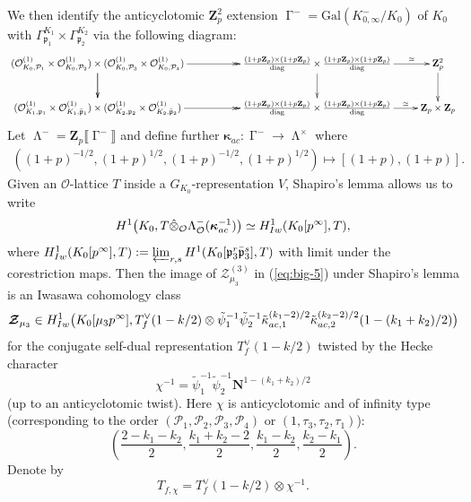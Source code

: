 \documentclass[10pt,letterpaper]{amsart}
\theoremstyle{plain}
\theoremstyle{definition}
\theoremstyle{definition}
\theoremstyle{plain}
\theoremstyle{plain}
\theoremstyle{plain}
\theoremstyle{remark}
\numberwithin{equation}{section}
\newcommand{\pp}{\mathfrak{p}}
\newcommand{\ppbar}{\bar{\mathfrak{p}}}
\DeclareMathOperator{\La}{\Lambda}
\DeclareMathOperator{\Ga}{\Gamma}
\def\cO{\mathcal O}
\def\cP{{\mathcal P}}
\newcommand{\Z}{\mathbf{Z}}
\newcommand{\dBr}[1]{\llbracket{#1}\rrbracket}
\begin{document}
We then identify the anticyclotomic $\Z_p^2$ extension $\Ga^{-}=\text{Gal}(K_{0,\infty}^{-}/K_0)$ of $K_0$ with $\Gamma_{\pp_1}^{K_1}\times \Gamma_{\pp_2}^{K_2}$ via the following diagram:
\begin{equation}
    \label{eq:G_K0^-identification}
\xymatrix{
(\mathcal{O}_{K_0,\cP_1}^{(1)}\times \mathcal{O}_{K_0,\cP_2}^{(1)})\times (\mathcal{O}_{K_0,\cP_3}^{(1)}\times \mathcal{O}_{K_0,\cP_4}^{(1)})\ar[d]\ar@{->>}[rr]\ar[d]&&\frac{(1+p\Z_p)\times(1+p\Z_p)}{\mathrm{diag}}\times \frac{(1+p\Z_p)\times(1+p\Z_p)}{\mathrm{diag}}\ar[d] \ar[r]^-{\simeq}&\Z_p^2\ar[d]\\
(\mathcal{O}_{K_1,\mathfrak{p}_1}^{(1)}\times \mathcal{O}_{K_1,\ppbar_1}^{(1)})\times (\mathcal{O}_{K_2,\mathfrak{p}_2}^{(1)}\times \mathcal{O}_{K_2,\ppbar_2}^{(1)})\ar@{->>}[rr]&&\frac{(1+p\Z_p)\times(1+p\Z_p)}{\mathrm{diag}}\times \frac{(1+p\Z_p)\times(1+p\Z_p)}{\mathrm{diag}}\ar[r]^-{\simeq}&\Z_p\times \Z_p
}
\end{equation}
Let $\La^-=\Z_p\dBr{\Ga^-}$ and define further $\bm{\kappa}_{ac}:\Ga^- \rightarrow \La^{\times}$ where
\begin{align*}
    ((1+p)^{-1/2},(1+p)^{1/2},(1+p)^{-1/2},(1+p)^{1/2})\mapsto [(1+p),(1+p)].
\end{align*}
Given an $\cO$-lattice $T$  inside a $G_{K_0}$-representation $V$, Shapiro's lemma allows us to write
\[
H^1\bigl(K_0,T\hat\otimes_{\cO}\Lambda_\cO^-(\boldsymbol{\kappa}_{\rm ac}^{-1})\bigr)\simeq H^1_{\rm Iw}(K_0[p^\infty],T),
\]
where $H^1_{\rm Iw}(K_0[p^\infty],T):=\varprojlim_{r,s} H^1(K_0[\mathfrak{p}_3^r\bar{\mathfrak{p}}_3^s],T)$ with limit under the corestriction maps. Then the image of $\boldsymbol{\mathcal{Z}}^{(3)}_{\mu_3}$ in (\ref{eq:big-5}) under Shapiro's lemma is an Iwasawa cohomology class
\begin{equation}\label{eq:big-class}
\boldsymbol{\mathcal{Z}}_{\mu_3}\in H^1_{\rm Iw}\bigl(K_0[\mu_3 p^\infty],T_f^\vee(1-k/2)\otimes\tilde{\psi}_1^{-1}\tilde{\psi}_2^{-1}\tilde{\kappa}_{\rm ac,1}^{(k_1-2)/2}\tilde{\kappa}_{\rm ac,2}^{(k_2-2)/2}(1-(k_1+k_2)/2)\bigr)
\end{equation}
 for the conjugate self-dual representation $T_f^\vee(1-k/2)$ twisted by the Hecke character 
\[\chi^{-1}=\tilde{\psi}_1^{-1}\tilde{\psi}_2^{-1}\mathbf{N}^{1-(k_1+k_2)/2}\]
(up to an anticyclotomic twist).
Here $\chi$ is anticyclotomic and of infinity type (corresponding to the order $(\cP_1,\cP_2,\cP_3,\cP_4)$ or $(1,\tau_3,\tau_2,\tau_1)$):
\[\left(\frac{2-k_1-k_2}{2},\frac{k_1+k_2-2}{2},\frac{k_1-k_2}{2},\frac{k_2-k_1}{2}\right).\] 
Denote by
\begin{equation}\label{eq:self-rep}
T_{f,\chi}=T_f^{\vee}(1-k/2)\otimes\chi^{-1}.
\end{equation}
\end{document}
